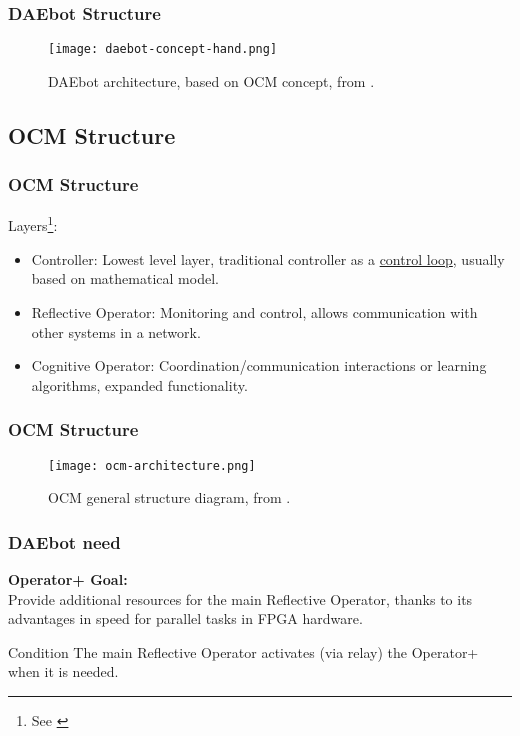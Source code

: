 \begin{frame}
	\frametitle{DAEbot Structure}
	\begin{figure}
		\texttt{[image: daebot-concept-hand.png]}
		\caption{DAEbot architecture, based on OCM concept, from \cite{Wiki}.}\label{fig:daebot-concept-hand}
	\end{figure}
\end{frame}

\subsection{OCM Structure}

\begin{frame}
	\frametitle{OCM Structure}
	Layers\footnote[frame]{See \cite{Lueckel2001}}:
	\begin{itemize}
		\item Controller: Lowest level layer, traditional controller as a \underline{control loop}, usually based on mathematical model. \pause
		\item Reflective Operator: Monitoring and control, allows communication with other systems in a network. \pause
		\item Cognitive Operator: Coordination/communication interactions or learning algorithms, expanded functionality.
	\end{itemize}
\end{frame}

\begin{frame}
	\frametitle{OCM Structure}
	\begin{figure}
		\texttt{[image: ocm-architecture.png]}
		\caption{OCM general structure diagram, from \cite{Wiki}.}\label{fig:ocm-architecture}
	\end{figure}
\end{frame}

\begin{frame}
	\frametitle{DAEbot need}
	\textbf{\LARGE{Operator+ Goal:}} \\
	\large{Provide additional resources for the main Reflective Operator, thanks to its advantages in speed for parallel tasks in FPGA hardware.}
	\vfill \pause
	\begin{exampleblock}{Condition}
		The main Reflective Operator activates (via relay) the Operator+ when it is needed.
	\end{exampleblock}
\end{frame}